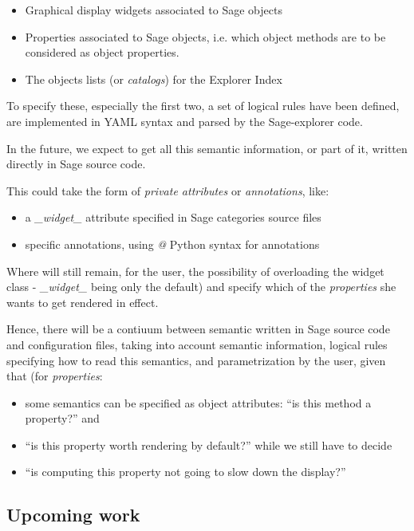 \documentclass{deliverablereport}
\begin{document}
\begin{itemize}
\item Graphical display widgets associated to Sage objects
  \item Properties associated to Sage objects, i.e. which object methods are
    to be considered as object properties.
\item The objects lists (or \emph{catalogs}) for the Explorer Index
\end{itemize}

To specify these, especially the first two, a set of logical rules
have been defined, are implemented in YAML syntax and parsed by the
Sage-explorer code.

In the future, we expect to get all this semantic information, or part of it,
written directly in Sage source code.

This could take the form of \emph{private attributes} or \emph{annotations}, like:

\begin{itemize}
\item a \emph{\_widget\_} attribute specified in Sage categories source files
\item specific annotations, using \emph{@} Python syntax for annotations
  \end{itemize}

Where will still remain, for the user, the possibility of overloading
the widget class - \emph{\_widget\_} being only the default) and
specify which of the \emph{properties} she wants to get rendered in effect.

Hence, there will be a contiuum between semantic written in Sage
source code and configuration files, taking into account semantic
information, logical rules specifying how to read this semantics, and
parametrization by the user, given that (for \emph{properties}:

\begin{itemize}
\item some semantics can be specified as object attributes: ``is this method a
  property?'' and
  \item ``is this property worth rendering by default?''  while we
    still have to decide
  \item ``is computing this property not going to slow down the display?''
\end{itemize}

\subsection{Upcoming work}
\end{document}
